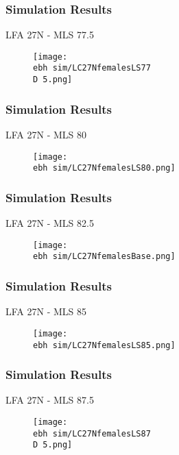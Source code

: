 \documentclass{beamer}
\newcommand{\ebh}{\string~/bio.data/bio.lobster/figures/LFA2733Framework2018/} %
\newcommand{\D}{.}
\begin{document}
\begin{frame}
\frametitle{Simulation Results}
LFA 27N - MLS 77.5
\begin{figure}
        \begin{center}
            \texttt{[image: \\ebh sim/LC27NfemalesLS77\\D 5.png]}
        \end{center}
    \end{figure}
\end{frame}


\begin{frame}
\frametitle{Simulation Results}
LFA 27N - MLS 80
\begin{figure}
        \begin{center}
            \texttt{[image: \\ebh sim/LC27NfemalesLS80.png]}
        \end{center}
    \end{figure}
\end{frame}


\begin{frame}
\frametitle{Simulation Results}
LFA 27N - MLS 82.5
\begin{figure}
        \begin{center}
            \texttt{[image: \\ebh sim/LC27NfemalesBase.png]}
        \end{center}
    \end{figure}
\end{frame}



\begin{frame}
\frametitle{Simulation Results}
LFA 27N - MLS 85
\begin{figure}
        \begin{center}
            \texttt{[image: \\ebh sim/LC27NfemalesLS85.png]}
        \end{center}
    \end{figure}
\end{frame}


\begin{frame}
\frametitle{Simulation Results}
LFA 27N - MLS 87.5
\begin{figure}
        \begin{center}
            \texttt{[image: \\ebh sim/LC27NfemalesLS87\\D 5.png]}
        \end{center}
    \end{figure}
\end{frame}
\end{document}
